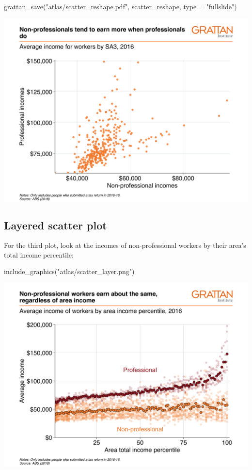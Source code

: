 \documentclass[
]{book}
\newenvironment{Shaded}{\begin{snugshade}}{\end{snugshade}}
\newcommand{\AttributeTok}[1]{\textcolor[rgb]{0.77,0.63,0.00}{#1}}
\newcommand{\FunctionTok}[1]{\textcolor[rgb]{0.00,0.00,0.00}{#1}}
\newcommand{\NormalTok}[1]{#1}
\newcommand{\StringTok}[1]{\textcolor[rgb]{0.31,0.60,0.02}{#1}}
\begin{document}
\begin{Shaded}
\begin{Highlighting}[]
\FunctionTok{grattan\_save}\NormalTok{(}\StringTok{"atlas/scatter\_reshape.pdf"}\NormalTok{, scatter\_reshape, }\AttributeTok{type =} \StringTok{"fullslide"}\NormalTok{)}
\end{Highlighting}
\end{Shaded}

\includegraphics{atlas/scatter_reshape.png}

\hypertarget{layered-scatter-plot}{%
\subsection{Layered scatter plot}\label{layered-scatter-plot}}

For the third plot, look at the incomes of non-professional workers by their area's total income percentile:

\begin{Shaded}
\begin{Highlighting}[]
\FunctionTok{include\_graphics}\NormalTok{(}\StringTok{"atlas/scatter\_layer.png"}\NormalTok{)}
\end{Highlighting}
\end{Shaded}

\includegraphics{atlas/scatter_layer.png}
\end{document}
